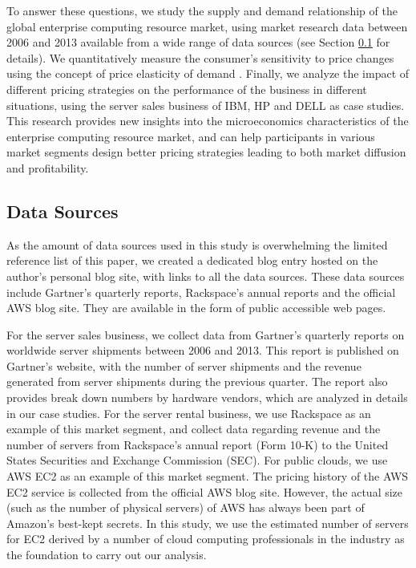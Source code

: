 \documentclass[10pt,journal,cspaper,compsoc]{IEEEtran}
\begin{document}
To answer these questions, we study the supply and demand relationship of the global enterprise computing resource market, using market research data between 2006 and 2013 available from a wide range of data sources  (see Section \ref{sec:data} for details). We quantitatively measure the consumer's sensitivity to price changes using the concept of price elasticity of demand \cite{marshall}. Finally, we analyze the impact of different pricing strategies on the performance of the business in different situations, using the server sales business of IBM, HP and DELL as case studies. This research provides new insights into the microeconomics characteristics of the enterprise computing resource market, and can help participants in various market segments design better pricing strategies leading to both market diffusion and profitability.  

\subsection{Data Sources}
\label{sec:data}
As the amount of data sources used in this study is overwhelming the limited reference list of this paper, we created a dedicated blog entry \cite{qyjohn} hosted on the author's personal blog site, with links to all the data sources. These data sources include Gartner's quarterly reports, Rackspace's annual reports and  the official AWS blog site. They are available in the form of public accessible web pages. 

For the server sales business, we collect data from Gartner's quarterly reports on worldwide server shipments between 2006 and 2013. This report is published on Gartner's website, with the number of server shipments and the revenue generated from server shipments during the previous quarter.  The report also provides break down numbers by hardware vendors, which are analyzed in details in our case studies. For the server rental business, we use Rackspace as an example of this market segment, and collect data regarding revenue and the number of servers from Rackspace's annual report (Form 10-K) to the United States Securities and Exchange Commission (SEC). For public clouds, we use AWS EC2 as an example of this market segment. The pricing history of the AWS EC2 service is collected from the official AWS blog site. However, the actual size (such as the number of physical servers) of AWS has always been part of Amazon's best-kept secrets. In this study, we use the estimated number of servers for EC2 derived by a number of cloud computing professionals in the industry as the foundation to carry out our analysis.
\end{document}
